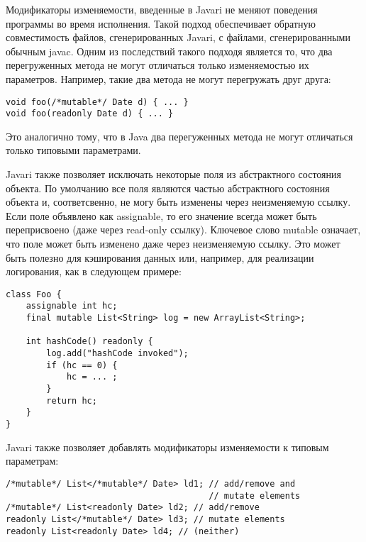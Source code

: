 Модификаторы изменяемости, введенные в Javari не меняют поведения программы во время исполнения. Такой подход обеспечивает обратную совместимость файлов, сгенерированных Javari, с файлами, сгенерированными обычным javac. Одним из последствий такого подходя является то, что два перегруженных метода не могут отличаться только изменяемостью их параметров. Например, такие два метода не могут перегружать друг друга:

\begin{lstlisting}[caption=Перегрузка методов, label=code:javari_method_overloading]
void foo(/*mutable*/ Date d) { ... } 
void foo(readonly Date d) { ... }
\end{lstlisting}

Это аналогично тому, что в Java два перегуженных метода не могут отличаться только типовыми параметрами.

Javari также позволяет исключать некоторые поля из абстрактного состояния объекта. По умолчанию все поля являются частью абстрактного состояния объекта и, соответсвенно, не могу быть изменены через неизменяемую ссылку. Если поле объявлено как assignable, то его значение всегда может быть переприсвоено (даже через read-only ссылку). Ключевое слово mutable означает, что поле может быть изменено даже через неизменяемую ссылку. Это может быть полезно для кэширования данных или, например, для реализации логирования, как в следующем примере:

\begin{lstlisting}[caption=assignable и mutable поля, label=code:assignable_mutable]
class Foo { 
    assignable int hc; 
    final mutable List<String> log = new ArrayList<String>;
    
    int hashCode() readonly { 
        log.add("hashCode invoked");
        if (hc == 0) { 
            hc = ... ;
        } 
        return hc; 
    } 
}
\end{lstlisting}

Javari также позволяет добавлять модификаторы изменяемости к типовым параметрам:

\begin{lstlisting}[caption=Модификаторы изменяемости в типовых параметрах, label=code:javari_generic_local]
/*mutable*/ List</*mutable*/ Date> ld1; // add/remove and 
                                        // mutate elements 
/*mutable*/ List<readonly Date> ld2; // add/remove 
readonly List</*mutable*/ Date> ld3; // mutate elements 
readonly List<readonly Date> ld4; // (neither)
\end{lstlisting} 

